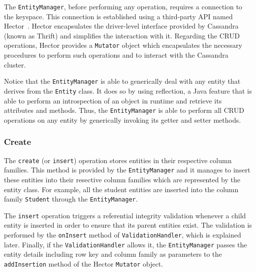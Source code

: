 	The \texttt{EntityManager},  before performing any operation,  requires a
	connection to the keyspace.  This connection is established using a third-party
	\ac{API} named Hector~\citep{hector}.  Hector  encapsulates the driver-level
	interface provided by Cassandra (known as Thrift) and simplifies the interaction
	with it.  Regarding the \ac{CRUD} operations,  Hector provides  a
	\texttt{Mutator} object which encapsulates the necessary procedures to perform
	such operations and to interact with the Cassandra cluster.
	 
	 Notice that  the \texttt{EntityManager} is able to generically deal with any
	 entity that derives from the \texttt{Entity} class.  It does so by using
	 reflection,  a Java  feature that is able to perform an introspection of an
	 object in runtime and retrieve its attributes and methods. 
	 Thus,  the  \texttt{EntityManager} is able to perform all \ac{CRUD} operations
	 on any entity by generically invoking its getter and setter methods.
	 
	 
	
	
	
	
	
		\subsubsection{Create}
		The \texttt{create} (or \texttt{insert}) operation stores entities in their
		respective column families. This method is provided by the
		\texttt{EntityManager} and it manages to insert these entities into their
		resective  column families which are represented by the entity class.
		For example, all the student entities are inserted into the column family
		\texttt{Student} through the \texttt{EntityManager}.  
		
		The \texttt{insert} operation triggers a referential integrity validation
		whenever a child entity is  inserted in order to ensure that its parent entities
		exist.  The validation is performed by the \texttt{onInsert} method of
		\texttt{ValidationHandler},  which is explained later.  Finally, if the
		\texttt{ValidationHandler} allows it, the \texttt{EntityManager} passes the
		entity details  including row key and column family as
		parameters to the \texttt{addInsertion} method of the Hector \texttt{Mutator}
		object.
			

